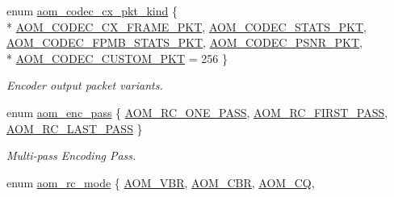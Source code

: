 \begin{DoxyCompactItemize}
\item 
enum \hyperlink{group__encoder_gafeb69da4a9649a54e805f59c26d8dfed}{aom\+\_\+codec\+\_\+cx\+\_\+pkt\+\_\+kind} \{ \\*
\hyperlink{group__encoder_ggafeb69da4a9649a54e805f59c26d8dfeda793165d0f219812342f69d5fd9b2b9c8}{A\+O\+M\+\_\+\+C\+O\+D\+E\+C\+\_\+\+C\+X\+\_\+\+F\+R\+A\+M\+E\+\_\+\+P\+KT}, 
\hyperlink{group__encoder_ggafeb69da4a9649a54e805f59c26d8dfeda7dcdcb6c401cac64ca98b51f52de8d4b}{A\+O\+M\+\_\+\+C\+O\+D\+E\+C\+\_\+\+S\+T\+A\+T\+S\+\_\+\+P\+KT}, 
\hyperlink{group__encoder_ggafeb69da4a9649a54e805f59c26d8dfedaaa76df44da4c92b08150b8a5326f5ebe}{A\+O\+M\+\_\+\+C\+O\+D\+E\+C\+\_\+\+F\+P\+M\+B\+\_\+\+S\+T\+A\+T\+S\+\_\+\+P\+KT}, 
\hyperlink{group__encoder_ggafeb69da4a9649a54e805f59c26d8dfeda3293bb764f30c11e9583510029578b75}{A\+O\+M\+\_\+\+C\+O\+D\+E\+C\+\_\+\+P\+S\+N\+R\+\_\+\+P\+KT}, 
\\*
\hyperlink{group__encoder_ggafeb69da4a9649a54e805f59c26d8dfeda476a2ac59be68d61662824316bd57a8e}{A\+O\+M\+\_\+\+C\+O\+D\+E\+C\+\_\+\+C\+U\+S\+T\+O\+M\+\_\+\+P\+KT} = 256
 \}\begin{DoxyCompactList}\small\item\em Encoder output packet variants. \end{DoxyCompactList}
\item 
enum \hyperlink{group__encoder_ga92b6709b58dc3435e3ba652da562eda1}{aom\+\_\+enc\+\_\+pass} \{ \hyperlink{group__encoder_gga92b6709b58dc3435e3ba652da562eda1a1b4b8ee9c1910fc59ac9dfd9700f3f02}{A\+O\+M\+\_\+\+R\+C\+\_\+\+O\+N\+E\+\_\+\+P\+A\+SS}, 
\hyperlink{group__encoder_gga92b6709b58dc3435e3ba652da562eda1ad342b33a290482c20238bfde5d9bea1e}{A\+O\+M\+\_\+\+R\+C\+\_\+\+F\+I\+R\+S\+T\+\_\+\+P\+A\+SS}, 
\hyperlink{group__encoder_gga92b6709b58dc3435e3ba652da562eda1a621c3f07937527618dc06e962425f6cc}{A\+O\+M\+\_\+\+R\+C\+\_\+\+L\+A\+S\+T\+\_\+\+P\+A\+SS}
 \}\begin{DoxyCompactList}\small\item\em Multi-\/pass Encoding Pass. \end{DoxyCompactList}
\item 
enum \hyperlink{group__encoder_ga7c084d3ecef569aad166ce70b0e8a957}{aom\+\_\+rc\+\_\+mode} \{ \hyperlink{group__encoder_gga7c084d3ecef569aad166ce70b0e8a957a7d3a2574737ea63d0f160ffdbd7f0110}{A\+O\+M\+\_\+\+V\+BR}, 
\hyperlink{group__encoder_gga7c084d3ecef569aad166ce70b0e8a957a14b6057d61c61e6117f5af16dcf89b0c}{A\+O\+M\+\_\+\+C\+BR}, 
\hyperlink{group__encoder_gga7c084d3ecef569aad166ce70b0e8a957a70aa1f15e91f6576ba3e63879947be64}{A\+O\+M\+\_\+\+CQ}, 

\end{DoxyCompactItemize}
